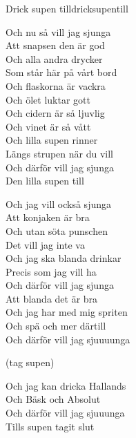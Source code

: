 \begin{song}{Drick supen till}{dricksupentill}
\begin{vers}
Och nu så vill jag sjunga\\
Att snapsen den är god\\
Och alla andra drycker\\
Som står här på vårt bord\\
Och flaskorna är vackra\\
Och ölet luktar gott\\
Och cidern är så ljuvlig\\
Och vinet är så vått\\
Och lilla supen rinner\\
Längs strupen när du vill\\
Och därför vill jag sjunga\\
Den lilla supen till\\
\end{vers}
\begin{vers}
Och jag vill också sjunga\\
Att konjaken är bra\\
Och utan söta punschen\\
Det vill jag inte va\\
Och jag ska blanda drinkar\\
Precis som jag vill ha\\
Och därför vill jag sjunga\\
Att blanda det är bra\\
Och jag har med mig spriten\\
Och spä och mer därtill\\
Och därför vill jag sjuuuunga\\
\end{vers}
\begin{vers}
(tag supen)\\
\end{vers}
\begin{vers}
Och jag kan dricka Hallands\\
Och Bäsk och Absolut\\
Och därför vill jag sjuuunga\\
Tills supen tagit slut\\
\end{vers}
\end{song}
